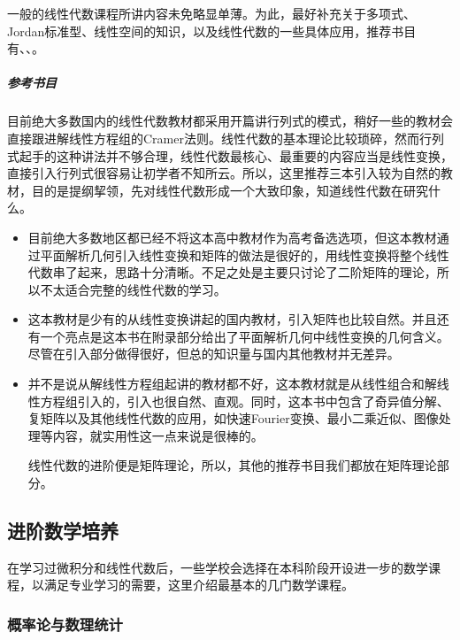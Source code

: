 一般的线性代数课程所讲内容未免略显单薄。为此，最好补充关于多项式、Jordan标准型、线性空间的知识，以及线性代数的一些具体应用，推荐书目有\textcite[线性代数：第5版]{线性代数5}、\textcite[线性代数应该这样学]{阿克斯勒杜现昆2016线性代数应该这样学}、\textcite[高等代数学]{张贤科2004高等代数学}。

\subparagraph{参考书目}\mbox{}

目前绝大多数国内的线性代数教材都采用开篇讲行列式的模式，稍好一些的教材会直接跟进解线性方程组的Cramer法则。线性代数的基本理论比较琐碎，然而行列式起手的这种讲法并不够合理，线性代数最核心、最重要的内容应当是线性变换，直接引入行列式很容易让初学者不知所云。所以，这里推荐三本引入较为自然的教材，目的是提纲挈领，先对线性代数形成一个大致印象，知道线性代数在研究什么。

\begin{itemize}
	\item \textcite[普通高中课程标准实验教科书\ 数学\ 选修4-2\ A版\ 矩阵与变换]{矩阵与变换}

	      目前绝大多数地区都已经不将这本高中教材作为高考备选选项，但这本教材通过平面解析几何引入线性变换和矩阵的做法是很好的，用线性变换将整个线性代数串了起来，思路十分清晰。不足之处是主要只讨论了二阶矩阵的理论，所以不太适合完整的线性代数的学习。
	\item \textcite[线性代数]{线性代数}

	      这本教材是少有的从线性变换讲起的国内教材，引入矩阵也比较自然。并且还有一个亮点是这本书在附录部分给出了平面解析几何中线性变换的几何含义。尽管在引入部分做得很好，但总的知识量与国内其他教材并无差异。

	\item \textcite[线性代数：第5版]{线性代数5}

	      并不是说从解线性方程组起讲的教材都不好，这本教材就是从线性组合和解线性方程组引入的，引入也很自然、直观。同时，这本书中包含了奇异值分解、复矩阵以及其他线性代数的应用，如快速Fourier变换、最小二乘近似、图像处理等内容，就实用性这一点来说是很棒的。

	      线性代数的进阶便是矩阵理论，所以，其他的推荐书目我们都放在矩阵理论部分。
\end{itemize}
\subsection{进阶数学培养}

在学习过微积分和线性代数后，一些学校会选择在本科阶段开设进一步的数学课程，以满足专业学习的需要，这里介绍最基本的几门数学课程。

\subsubsection{概率论与数理统计}

